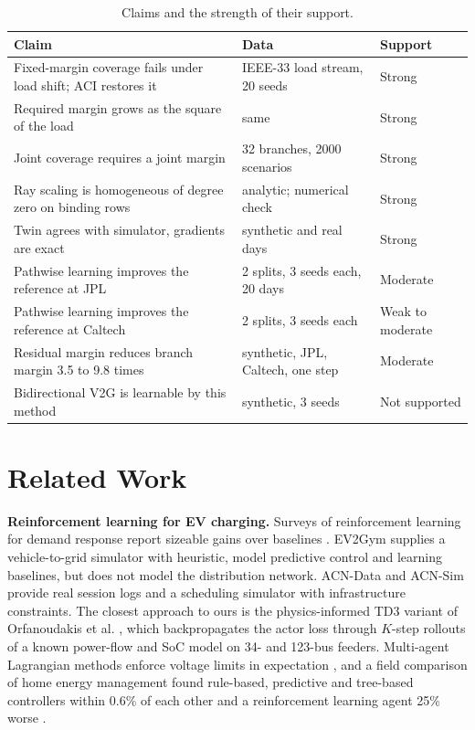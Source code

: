 \documentclass[11pt]{article}
\begin{document}
\begin{table}[h]\centering\small
\begin{tabular}{L{6.2cm}L{4.3cm}L{3.6cm}}\toprule
Claim & Data & Support\\\midrule
Fixed-margin coverage fails under load shift; ACI restores it & IEEE-33 load stream, 20 seeds & Strong\\
Required margin grows as the square of the load & same & Strong\\
Joint coverage requires a joint margin & 32 branches, 2000 scenarios & Strong\\
Ray scaling is homogeneous of degree zero on binding rows & analytic; numerical check & Strong\\
Twin agrees with simulator, gradients are exact & synthetic and real days & Strong\\
Pathwise learning improves the reference at JPL & 2 splits, 3 seeds each, 20 days & Moderate\\
Pathwise learning improves the reference at Caltech & 2 splits, 3 seeds each & Weak to moderate\\
Residual margin reduces branch margin 3.5 to 9.8 times & synthetic, JPL, Caltech, one step & Moderate\\
Bidirectional V2G is learnable by this method & synthetic, 3 seeds & Not supported\\\bottomrule
\end{tabular}\caption{Claims and the strength of their support.}\label{tab:status}\end{table}

\section{Related Work}\label{sec:related}
\textbf{Reinforcement learning for EV charging.} Surveys of reinforcement learning for demand response report sizeable gains over baselines \cite{vazquez}. EV2Gym \cite{ev2gym} supplies a vehicle-to-grid simulator with heuristic, model predictive control and learning baselines, but does not model the distribution network. ACN-Data and ACN-Sim \cite{acn,acnsim} provide real session logs and a scheduling simulator with infrastructure constraints. The closest approach to ours is the physics-informed TD3 variant of Orfanoudakis et al. \cite{pitd3}, which backpropagates the actor loss through $K$-step rollouts of a known power-flow and SoC model on 34- and 123-bus feeders. Multi-agent Lagrangian methods enforce voltage limits in expectation \cite{tlmappo}, and a field comparison of home energy management found rule-based, predictive and tree-based controllers within 0.6\% of each other and a reinforcement learning agent 25\% worse \cite{ruddick}.
\end{document}
